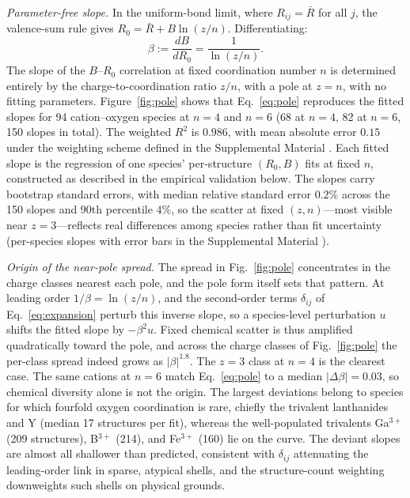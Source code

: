 \documentclass[aps,prmaterials,twocolumn,10pt,superscriptaddress,floatfix]{revtex4-2}
\newcommand{\runinsec}[1]{\medskip\emph{#1}}
\begin{document}
\runinsec{Parameter-free slope.} In the uniform-bond limit, where
$R_{ij}=\bar R$ for all $j$, the valence-sum rule gives
$R_0=\bar R+B\ln(z/n)$.  Differentiating:
\begin{equation}\label{eq:pole}
\beta := \frac{dB}{dR_0} = \frac{1}{\ln(z/n)}.
\end{equation}
The slope of the $B$--$R_0$ correlation at fixed
coordination number $n$ is determined entirely by the charge-to-coordination
ratio $z/n$, with a pole at $z=n$, with no fitting parameters.
Figure~\ref{fig:pole} shows that Eq.~\eqref{eq:pole} reproduces the
fitted slopes for 94 cation--oxygen species at $n=4$ and $n=6$ (68 at
$n=4$, 82 at $n=6$, 150 slopes in total).  The weighted $R^2$ is
$0.986$, with mean absolute error $0.15$ under the weighting scheme
defined in the Supplemental Material \cite{suppmat}.  Each fitted
slope is the regression of one species' per-structure $(R_0,B)$ fits at fixed $n$,
constructed as described in the empirical validation below.  The
slopes carry bootstrap standard errors, with median relative
standard error $0.2\%$ across the 150 slopes and 90th percentile
$4\%$, so the scatter at fixed $(z,n)$---most visible near
$z=3$---reflects real differences among species rather than fit
uncertainty (per-species slopes with error bars in the Supplemental
Material \cite{suppmat}).

\runinsec{Origin of the near-pole spread.}  The spread in
Fig.~\ref{fig:pole} concentrates in the charge classes nearest each
pole, and the pole form itself sets that pattern.  At leading order
$1/\beta=\ln(z/n)$, and the second-order terms $\delta_{ij}$ of
Eq.~\eqref{eq:expansion} perturb this inverse slope, so a
species-level perturbation $u$ shifts the fitted slope by
$-\beta^{2}u$.  Fixed chemical scatter is thus amplified
quadratically toward the pole, and across the charge classes of
Fig.~\ref{fig:pole} the per-class spread indeed grows as
$|\beta|^{1.8}$.  The $z=3$ class at $n=4$ is the clearest case.
The same cations at $n=6$ match Eq.~\eqref{eq:pole} to a median
$|\Delta\beta|=0.03$, so chemical diversity alone is not the
origin.  The largest deviations belong to species for which
fourfold oxygen coordination is rare, chiefly the trivalent
lanthanides and Y (median 17 structures per fit), whereas the
well-populated trivalents Ga$^{3+}$ (209 structures), B$^{3+}$
(214), and Fe$^{3+}$ (160) lie on the curve.  The deviant slopes
are almost all shallower than predicted, consistent with
$\delta_{ij}$ attenuating the leading-order link in sparse,
atypical shells, and the structure-count weighting downweights
such shells on physical grounds.
\end{document}
